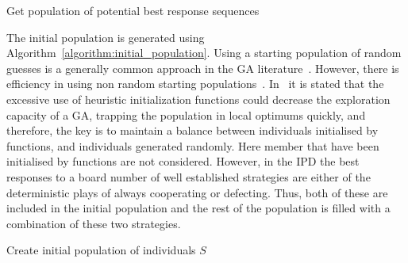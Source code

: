 \begin{algorithm}[!htbp]
    \SetAlgoLined
     \caption{Get population of potential best response sequences}\label{algorithm:genetic_algorithm}
\end{algorithm}

The initial population is generated using Algorithm~\ref{algorithm:initial_population}.
Using a starting population of random guesses is a generally common approach in
the GA literature~\cite{Hou1994}. However, there is efficiency in using non
random starting populations~\cite{Drezner2005}. In~\cite{Osaba2014} it is
stated that the excessive use of heuristic initialization functions
could decrease the exploration capacity of a GA, trapping the population in
local optimums quickly, and therefore, the key is to maintain a balance between
individuals initialised by functions, and individuals generated randomly.
Here member that have been initialised by functions are not considered. However,
in the IPD the best responses to a board number of well established strategies
are either of the deterministic plays of always cooperating or defecting.
Thus, both of these are included in the initial population and the rest of
the population is filled with a combination of these two strategies.

\begin{algorithm}[!htbp]
        \SetAlgoLined
    
     \caption{Create initial population of individuals \(S\)}\label{algorithm:initial_population}
\end{algorithm}

